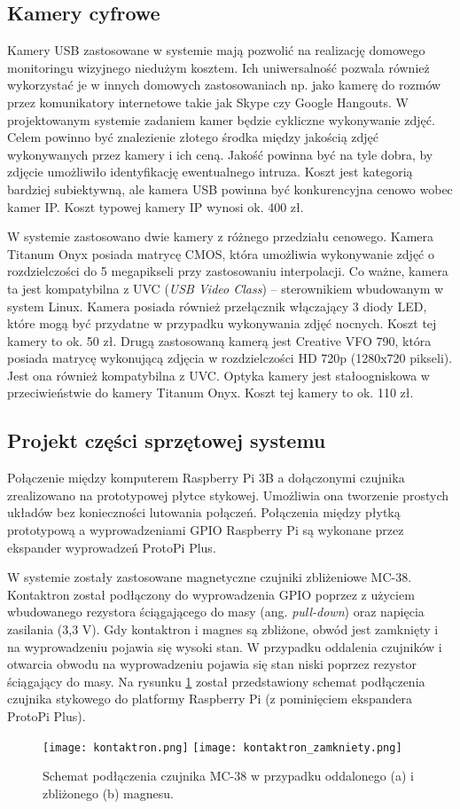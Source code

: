 \documentclass[a4paper,11pt,twoside]{article}
\begin{document}
\subsection{Kamery cyfrowe}
Kamery USB zastosowane w systemie mają pozwolić na realizację domowego monitoringu wizyjnego niedużym kosztem. Ich uniwersalność pozwala również wykorzystać je w innych domowych zastosowaniach np. jako kamerę do rozmów przez komunikatory internetowe takie jak Skype czy Google Hangouts. W projektowanym systemie zadaniem kamer będzie cykliczne wykonywanie zdjęć. Celem powinno być znalezienie złotego środka między jakością zdjęć wykonywanych przez kamery i ich ceną. Jakość powinna być na tyle dobra, by zdjęcie umożliwiło identyfikację ewentualnego intruza. Koszt jest kategorią bardziej subiektywną, ale kamera USB powinna być konkurencyjna cenowo wobec kamer IP. Koszt typowej kamery IP wynosi ok. 400 zł.\cite{komputer_świat}

W systemie zastosowano dwie kamery z różnego przedziału cenowego. Kamera Titanum Onyx posiada matrycę CMOS, która umożliwia wykonywanie zdjęć o rozdzielczości do 5 megapikseli przy zastosowaniu interpolacji. Co ważne, kamera ta jest kompatybilna z UVC (\textit{USB Video Class}) -- sterownikiem wbudowanym w system Linux. Kamera posiada również przełącznik włączający 3 diody LED, które mogą być przydatne w przypadku wykonywania zdjęć nocnych. Koszt tej kamery to ok. 50 zł. Drugą zastosowaną kamerą jest Creative VFO 790, która posiada matrycę wykonującą zdjęcia w rozdzielczości HD 720p (1280x720 pikseli). Jest ona również kompatybilna z UVC. Optyka kamery jest stałoogniskowa w przeciwieństwie do kamery Titanum Onyx. Koszt tej kamery to ok. 110 zł.

\subsection{Projekt części sprzętowej systemu}
Połączenie między komputerem Raspberry Pi 3B a dołączonymi czujnika zrealizowano na prototypowej płytce stykowej. Umożliwia ona tworzenie prostych układów bez konieczności lutowania połączeń. Połączenia między płytką prototypową a wyprowadzeniami GPIO Raspberry Pi są wykonane przez ekspander wyprowadzeń ProtoPi Plus.

W systemie zostały zastosowane magnetyczne czujniki zbliżeniowe MC-38. Kontaktron został podłączony do wyprowadzenia GPIO poprzez z użyciem wbudowanego rezystora ściągającego do masy (ang. \textit{pull-down}) oraz napięcia zasilania (3,3 V). Gdy kontaktron i magnes są zbliżone, obwód jest zamknięty i na wyprowadzeniu pojawia się wysoki stan. W przypadku oddalenia czujników i otwarcia obwodu na wyprowadzeniu pojawia się stan niski poprzez rezystor ściągający do masy. Na rysunku \ref{fig: kontaktron} został przedstawiony schemat podłączenia czujnika stykowego do platformy Raspberry Pi (z pominięciem ekspandera ProtoPi Plus).
\begin{figure}[h]
\texttt{[image: kontaktron.png]}
\texttt{[image: kontaktron\_zamkniety.png]}
\caption{Schemat podłączenia czujnika MC-38 w przypadku oddalonego (a) i zbliżonego (b) magnesu.}
\label{fig: kontaktron}
\end{figure}
\end{document}
